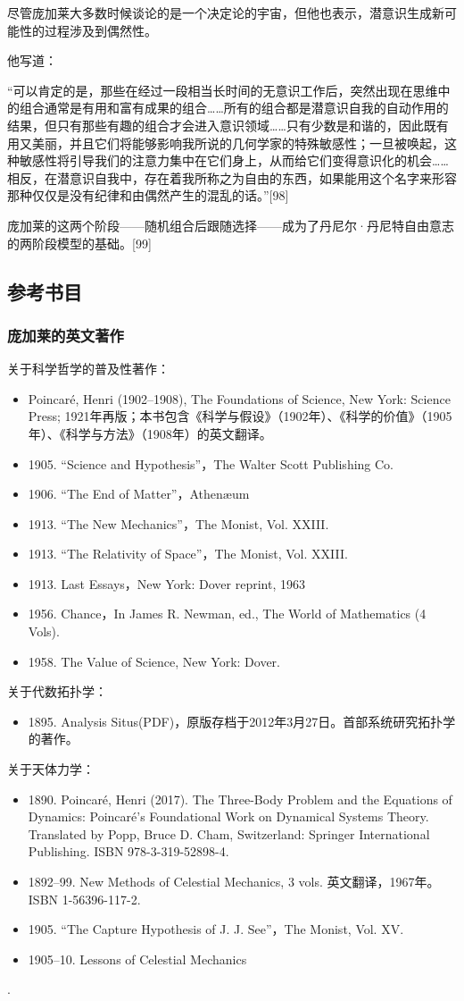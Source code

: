 尽管庞加莱大多数时候谈论的是一个决定论的宇宙，但他也表示，潜意识生成新可能性的过程涉及到偶然性。

他写道：

“可以肯定的是，那些在经过一段相当长时间的无意识工作后，突然出现在思维中的组合通常是有用和富有成果的组合……所有的组合都是潜意识自我的自动作用的结果，但只有那些有趣的组合才会进入意识领域……只有少数是和谐的，因此既有用又美丽，并且它们将能够影响我所说的几何学家的特殊敏感性；一旦被唤起，这种敏感性将引导我们的注意力集中在它们身上，从而给它们变得意识化的机会……相反，在潜意识自我中，存在着我所称之为自由的东西，如果能用这个名字来形容那种仅仅是没有纪律和由偶然产生的混乱的话。”[98]

庞加莱的这两个阶段——随机组合后跟随选择——成为了丹尼尔·丹尼特自由意志的两阶段模型的基础。[99]
\subsection{参考书目} 
\subsubsection{庞加莱的英文著作}  
关于科学哲学的普及性著作：
\begin{itemize}
\item Poincaré, Henri (1902–1908), The Foundations of Science, New York: Science Press; 1921年再版；本书包含《科学与假设》（1902年）、《科学的价值》（1905年）、《科学与方法》（1908年）的英文翻译。  
\item 1905. “Science and Hypothesis”，The Walter Scott Publishing Co.  
\item 1906. “The End of Matter”，Athenæum  
\item 1913. “The New Mechanics”，The Monist, Vol. XXIII.  
\item 1913. “The Relativity of Space”，The Monist, Vol. XXIII.  
\item 1913. Last Essays，New York: Dover reprint, 1963  
\item 1956. Chance，In James R. Newman, ed., The World of Mathematics (4 Vols).  
\item 1958. The Value of Science, New York: Dover.
\end{itemize}

关于代数拓扑学：
\begin{itemize}
\item 1895. Analysis Situs(PDF)，原版存档于2012年3月27日。首部系统研究拓扑学的著作。
\end{itemize}

关于天体力学：
\begin{itemize}
\item 1890. Poincaré, Henri (2017). The Three-Body Problem and the Equations of Dynamics: Poincaré's Foundational Work on Dynamical Systems Theory. Translated by Popp, Bruce D. Cham, Switzerland: Springer International Publishing. ISBN 978-3-319-52898-4.  
\item 1892–99. New Methods of Celestial Mechanics, 3 vols. 英文翻译，1967年。ISBN 1-56396-117-2.  
\item 1905. “The Capture Hypothesis of J. J. See”，The Monist, Vol. XV.  
\item 1905–10. Lessons of Celestial Mechanics
\end{itemize}.


